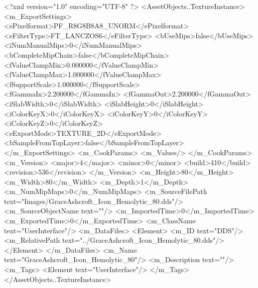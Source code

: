 <?xml version="1.0" encoding="UTF-8" ?>
<AssetObjects..TextureInstance>
	<m_ExportSettings>
		<ePixelformat>PF_R8G8B8A8_UNORM</ePixelformat>
		<eFilterType>FT_LANCZOS6</eFilterType>
		<bUseMips>false</bUseMips>
		<iNumManualMips>0</iNumManualMips>
		<bCompleteMipChain>false</bCompleteMipChain>
		<fValueClampMin>0.000000</fValueClampMin>
		<fValueClampMax>1.000000</fValueClampMax>
		<fSupportScale>1.000000</fSupportScale>
		<fGammaIn>2.200000</fGammaIn>
		<fGammaOut>2.200000</fGammaOut>
		<iSlabWidth>0</iSlabWidth>
		<iSlabHeight>0</iSlabHeight>
		<iColorKeyX>0</iColorKeyX>
		<iColorKeyY>0</iColorKeyY>
		<iColorKeyZ>0</iColorKeyZ>
		<eExportMode>TEXTURE_2D</eExportMode>
		<bSampleFromTopLayer>false</bSampleFromTopLayer>
	</m_ExportSettings>
	<m_CookParams>
		<m_Values/>
	</m_CookParams>
	<m_Version>
		<major>4</major>
		<minor>0</minor>
		<build>410</build>
		<revision>536</revision>
	</m_Version>
	<m_Height>80</m_Height>
	<m_Width>80</m_Width>
	<m_Depth>1</m_Depth>
	<m_NumMipMaps>0</m_NumMipMaps>
	<m_SourceFilePath text="Images/GraceAshcroft_Icon_Hemolytic_80.dds"/>
	<m_SourceObjectName text=""/>
	<m_ImportedTime>0</m_ImportedTime>
	<m_ExportedTime>0</m_ExportedTime>
	<m_ClassName text="UserInterface"/>
	<m_DataFiles>
		<Element>
			<m_ID text="DDS"/>
			<m_RelativePath text="../GraceAshcroft_Icon_Hemolytic_80.dds"/>
		</Element>
	</m_DataFiles>
	<m_Name text="GraceAshcroft_Icon_Hemolytic_80"/>
	<m_Description text=""/>
	<m_Tags>
		<Element text="UserInterface"/>
	</m_Tags>
</AssetObjects..TextureInstance>
